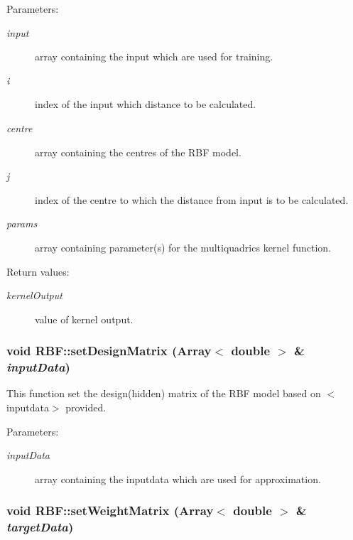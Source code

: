 \begin{Desc}
\item[Parameters:]
\begin{description}
\item[{\em input}]array containing the input which are used for training. \item[{\em i}]index of the input which distance to be calculated. \item[{\em centre}]array containing the centres of the RBF model. \item[{\em j}]index of the centre to which the distance from input is to be calculated. \item[{\em params}]array containing parameter(s) for the multiquadrics kernel function. \end{description}
\end{Desc}
\begin{Desc}
\item[Return values:]
\begin{description}
\item[{\em kernel\-Output}]value of kernel output.\end{description}
\end{Desc}
\subsubsection{\setlength{\rightskip}{0pt plus 5cm}void RBF::set\-Design\-Matrix (Array$<$ double $>$ \& {\em input\-Data})}\label{classRBF_a13}


This function set the design(hidden) matrix of the RBF model based on $<$inputdata$>$ provided. 

\begin{Desc}
\item[Parameters:]
\begin{description}
\item[{\em input\-Data}]array containing the inputdata which are used for approximation.\end{description}
\end{Desc}
\subsubsection{\setlength{\rightskip}{0pt plus 5cm}void RBF::set\-Weight\-Matrix (Array$<$ double $>$ \& {\em target\-Data})}\label{classRBF_a15}


